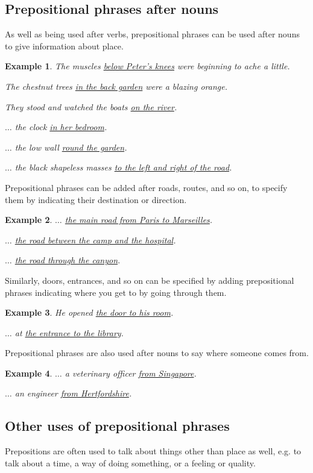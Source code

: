 \documentclass[oneside]{book}
\numberwithin{equation}{section}
\newtheorem{example}{Example}[section]
\begin{document}
\subsection{Prepositional phrases after nouns}
\noindent{} As well as being used after verbs, prepositional phrases can be used after nouns to give information about place.
\begin{example}
    The muscles \underline{below Peter's knees} were beginning to ache a little.
    
    The chestnut trees \underline{in the back garden} were a blazing orange.
    
    They stood and watched the boats \underline{on the river}.
    
    $\ldots$ the clock \underline{in her bedroom}.
    
    $\ldots$ the low wall \underline{round the garden}.
    
    $\ldots$ the black shapeless masses \underline{to the left and right of the road}.
\end{example}
%
\noindent{} Prepositional phrases can be added after roads, routes, and so on, to specify them by indicating their destination or direction.
\begin{example}
    $\ldots$ \underline{the main road from Paris to Marseilles}.
    
    $\ldots$ \underline{the road between the camp and the hospital}.
    
    $\ldots$ \underline{the road through the canyon}.
\end{example}
Similarly, doors, entrances, and so on can be specified by adding prepositional phrases indicating where you get to by going through them.
\begin{example}
    He opened \underline{the door to his room}.
    
    $\ldots$ at \underline{the entrance to the library}.
\end{example}
Prepositional phrases are also used after nouns to say where someone comes from.
\begin{example}
    $\ldots$ a veterinary officer \underline{from Singapore}.
    
    $\ldots$ an engineer \underline{from Hertfordshire}.
\end{example}

\subsection{Other uses of prepositional phrases}
\noindent{} Prepositions are often used to talk about things other than place as well, e.g. to talk about a time, a way of doing something, or a feeling or quality.
\end{document}
